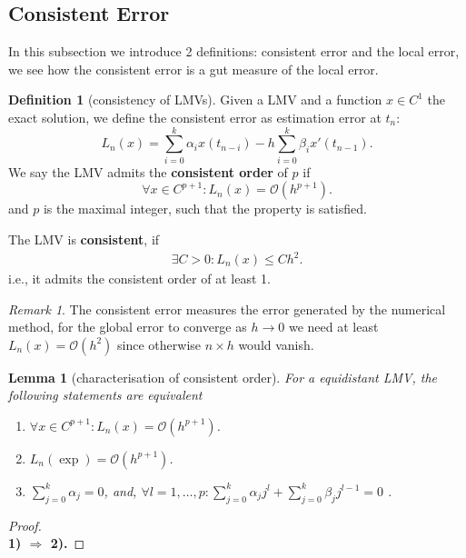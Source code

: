 \documentclass[a4paper,12pt,oneside,fleqn]{book}
\newtheorem{lemma}[theorem]{Lemma}
\theoremstyle{definition}
\newtheorem{definition}{Definition}[section]
\theoremstyle{remark}
\newtheorem*{remark}{Remark}
\begin{document}
\subsection{Consistent Error}
In this subsection we introduce 2 definitions: consistent error and the local error, we see how the consistent error is a gut measure of the local error. 
\begin{definition}[consistency of LMVs]
Given a LMV and a function $x \in C^1 $ the exact solution, we define the consistent error as estimation error at $t_n$:
\begin{equation}
	L_n(x) = \sum_{i = 0}^k \alpha_i x(t_{n - i}) - h \sum_{i = 0}^k \beta_i x'(t_{n -1}). 
\end{equation}
We say the LMV admits the \textbf{consistent order }of $p$ if 
\begin{equation}
	\forall x \in C^{p +1}:  L_n(x) = \mathcal{O}(h^{p + 1}). 
\end{equation}
and $p$ is the maximal integer, such that the property is satisfied. \par 
The LMV is \textbf{consistent}, if
\begin{align*}
	\exists C > 0 : L_n(x) \le C h^2. 
\end{align*}
i.e., it admits the consistent order of at least 1.
\end{definition}
\begin{remark}
The consistent error measures the error generated by the numerical method, for the global error to converge as $h \rightarrow 0$ we need at least $L_n(x) = \mathcal{O}(h^2)$ since otherwise $n \times h$ would vanish. 
\end{remark}


\begin{lemma}[characterisation of consistent order]
	For a equidistant LMV, the following statements are equivalent
	\begin{enumerate}
		\item $\forall x \in C^{p + 1}: L_n(x) = \mathcal{O}(h^{p+1})$. 
		\item $L_n(\exp) = \mathcal{O}(h^{p + 1})$. 
		\item $\sum_{j = 0}^k \alpha_j = 0$, and,  $\forall l = 1, \dots, p: \sum_{j = 0}^k \alpha_j j^l + \sum_{j = 0}^k \beta_j j^{l -1} = 0$ . 
	\end{enumerate}
\end{lemma}
\begin{proof}
\quad\\
\textbf{1) $\Rightarrow$ 2).}
\end{proof}
\end{document}
